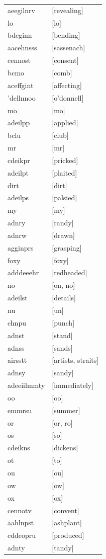 \documentclass{article}
\begin{document}
\begin{tabular}{ll}
aeegilnrv & [revealing] \\
lo & [lo] \\
bdeginn & [bending] \\
aacehnsss & [sassenach] \\
cennost & [consent] \\
bcmo & [comb] \\
aceffgint & [affecting] \\
'dellnnoo & [o'donnell] \\
mo & [mo] \\
adeilpp & [applied] \\
bclu & [club] \\
mr & [mr] \\
cdeikpr & [pricked] \\
adeilpt & [plaited] \\
dirt & [dirt] \\
adeilps & [palsied] \\
my & [my] \\
adnry & [randy] \\
adnrw & [drawn] \\
agginprs & [grasping] \\
foxy & [foxy] \\
adddeeehr & [redheaded] \\
no & [on, no] \\
adeilst & [details] \\
nu & [un] \\
chnpu & [punch] \\
adnst & [stand] \\
adnss & [sands] \\
airsstt & [artists, straits] \\
adnsy & [sandy] \\
adeeiilmmty & [immediately] \\
oo & [oo] \\
emmrsu & [summer] \\
or & [or, ro] \\
os & [so] \\
cdeikns & [dickens] \\
ot & [to] \\
ou & [ou] \\
ow & [ow] \\
ox & [ox] \\
cennotv & [convent] \\
aahlnpst & [ashplant] \\
cddeopru & [produced] \\
adnty & [tandy] \\

\end{tabular}
\end{document}
